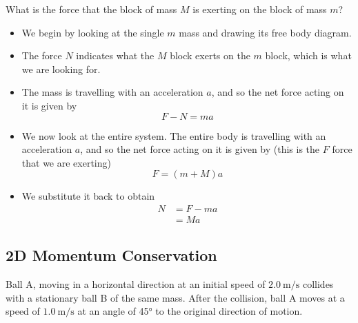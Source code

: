 \documentclass[a4paper,12pt]{article}
\begin{document}
What is the force that the block of mass $M$ is exerting on the block of mass $m$?

\begin{itemize}
  \item We begin by looking at the single $m$ mass and drawing its free body diagram.
  \item The force $N$ indicates what the $M$ block exerts on the $m$ block, which is what we are looking for.
\end{itemize}

\begin{figure}[H]
  \centering
\end{figure}

\begin{itemize}
  \item The mass is travelling with an acceleration $a$, and so the net force acting on it is given by
        $$F - N = ma$$
  \item We now look at the entire system. The entire body is travelling with an acceleration $a$, and so the net force acting on it is given by (this is the $F$ force that we are exerting)
        $$F = (m + M)a$$
  \item We substitute it back to obtain
        \begin{align*}
          N & = F - ma \\
            & = Ma
        \end{align*}
\end{itemize}




\subsection{2D Momentum Conservation}

Ball A, moving in a horizontal direction at an initial speed of $\SI{2.0}{\m\per\s}$ collides with a stationary ball B of the same mass. After the collision, ball A moves at a speed of $\SI{1.0}{\m\per\s}$ at an angle of 45° to the original direction of motion.
\end{document}
